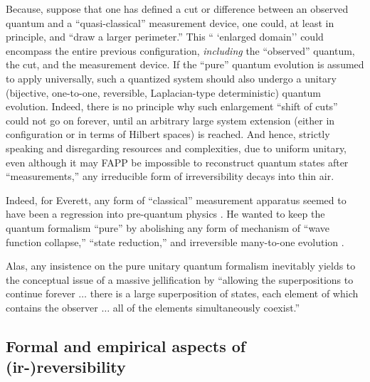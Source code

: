 \documentclass[%
  preprint,
 showpacs,
 showkeys,
 preprintnumbers,
 amsmath,amssymb,
 aps,
   pra,
  longbibliography,
 ]{revtex4-1}
\begin{document}
Because, suppose that one has defined a cut or difference between an observed quantum and a ``quasi-classical'' measurement device,
one could, at least in principle, and
``draw a larger perimeter.'' This `` `enlarged domain'' could encompass the entire previous configuration,
{\em including} the ``observed'' quantum, the cut, and the measurement device.
If the ``pure'' quantum evolution is assumed to apply universally, such a quantized system should also undergo
a unitary (bijective, one-to-one, reversible, Laplacian-type deterministic) quantum evolution.
Indeed, there is no principle why such enlargement ``shift of cuts'' could not go on forever,
until an arbitrary large system extension (either in configuration or in terms of Hilbert spaces)
is reached.
And hence, strictly speaking and disregarding resources and complexities, due to uniform unitary,
even although it may FAPP be impossible to reconstruct quantum states after  ``measurements,''
any irreducible form of irreversibility decays into thin air.

Indeed, for Everett, any form of ``classical'' measurement apparatus seemed to have been a regression
into pre-quantum physics \cite{Levy-Leblond}.
He wanted to keep the quantum formalism ``pure''
by abolishing any form of mechanism of ``wave function collapse,''
``state reduction,''
and irreversible many-to-one evolution  \cite{Barrett-2011}.


Alas, any insistence on the pure unitary quantum formalism inevitably yields  to the conceptual issue of a massive
jellification  by \cite[pp.~17-18]{werner-62}
``allowing the superpositions to continue forever $\ldots $
there is a large superposition of states, each element of which contains the observer $\ldots$
all of the elements simultaneously coexist.''

\subsection{Formal and empirical aspects of (ir-)reversibility}
\end{document}
